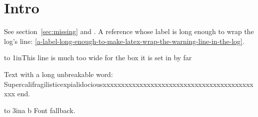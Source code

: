 \documentclass{article}
\begin{document}
\section{Intro}\label{sec:intro}
See section~\ref{sec:missing} and \cite{nobody}.
\label{sec:intro}
A reference whose label is long enough to wrap the log's line:
\ref{a-label-long-enough-to-make-latex-wrap-the-warning-line-in-the-log}.



\hbox to 1in{This line is much too wide for the box it is set in by far}

Text with a long unbreakable word:
Supercalifragilisticexpialidociousxxxxxxxxxxxxxxxxxxxxxxxxxxxxxxxxxxxxxxxxxxxx
end.

\hbox to 3in{a b}
{\selectfont Font fallback.}
\end{document}
